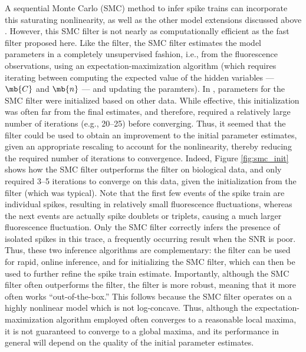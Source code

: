 A sequential Monte Carlo (SMC) method to infer spike trains can incorporate this saturating nonlinearity, as well as the other model extensions discussed above \cite{VogelsteinPaninski09} . However, this SMC filter is not nearly as computationally efficient as the fast filter proposed here.  Like the \foopsi filter, the SMC filter estimates the model parameters in a completely unsupervised fashion, i.e.,  from the fluorescence observations, using an expectation-maximization algorithm (which requires iterating between computing the expected value of the hidden variables --- $\mb{C}$ and $\mb{n}$ --- and updating the paramters).  In \cite{VogelsteinPaninski09}, parameters for the SMC filter were initialized based on other data.  While effective, this initialization was often far from the final estimates, and therefore, required a relatively large number of iterations (e.g., 20--25) before converging.  Thus, it seemed that the \foopsi filter could be used to obtain an improvement to the initial parameter estimates, given an appropriate rescaling to account for the nonlinearity, thereby reducing the required number of iterations to convergence.  Indeed, Figure \ref{fig:smc_init} shows how the SMC filter outperforms the \foopsi filter on biological data, and only required 3--5 iterations to converge on this data, given the initialization from the \foopsi filter (which was typical).  Note that the first few events of the spike train are individual spikes, resulting in relatively small fluorescence fluctuations, whereas the next events are actually spike doublets or triplets, causing a much larger fluorescence fluctuation.  Only the SMC filter correctly infers the presence of isolated spikes in this trace, a frequently occurring result when the SNR is poor.  Thus, these two inference algorithms are complementary: the \foopsi filter can be used for rapid, online inference, and for initializing the SMC filter, which can then be used to further refine the spike train estimate.  Importantly, although the SMC filter often outperforms the \foopsi filter, the \foopsi filter is more robust, meaning that it more often works ``out-of-the-box.''  This follows because the SMC filter operates on a highly nonlinear model which is not log-concave.  Thus, although the expectation-maximization algorithm employed often converges to a reasonable local maxima, it is not guaranteed to converge to a global maxima, and its performance in general will depend on the quality of the initial parameter estimates.  

